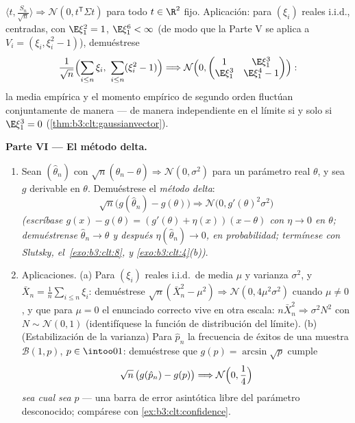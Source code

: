\begin{problem}
\begin{enumerate}[resume]
        $\langle t, \frac{S_n}{\sqrt n}\rangle
        \Rightarrow \mathcal N(0, t^{\mathsf T}\Sigma t)$ para todo
        $t \in \R^2$ fijo. Aplicación: para $(\xi_i)$ reales i.i.d.,
        centradas, con $\E\xi_1^2 = 1$, $\E\xi_1^6 < \infty$ (de modo
        que la Parte V se aplica a $V_i = (\xi_i, \xi_i^2 - 1)$),
        demuéstrese
        \[
        \frac1{\sqrt n}\Bigl(\sum_{i\leq n}\xi_i,\
        \sum_{i\leq n}(\xi_i^2 - 1)\Bigr) \Longrightarrow
        \mathcal N\Bigl(0, \begin{pmatrix} 1 & \E\xi_1^3\\
        \E\xi_1^3 & \E\xi_1^4 - 1\end{pmatrix}\Bigr) :
        \]
        la media empírica y el momento empírico de segundo orden
        fluctúan conjuntamente de manera  --- de manera
        independiente en el límite si y solo si $\E\xi_1^3 = 0$
        (\cref{thm:b3:clt:gaussianvector}).
\end{enumerate}

\medskip
\noindent\textbf{Parte VI --- El método delta.}
\begin{enumerate}[resume]
  \item Sean $(\hat\theta_n)$
   con
  $\sqrt n(\hat\theta_n - \theta) \Rightarrow
        \mathcal N(0, \sigma^2)$ para un parámetro real $\theta$, y sea
  $g$ derivable en $\theta$. Demuéstrese el \emph{método delta}:
        \[
        \sqrt n\bigl(g(\hat\theta_n) - g(\theta)\bigr)
        \Longrightarrow \mathcal N\bigl(0,
        g'(\theta)^2\sigma^2\bigr)
        \]
        \emph{(escríbase $g(x) - g(\theta) = (g'(\theta) +
        \eta(x))(x - \theta)$ con $\eta \to 0$ en $\theta$; demuéstrense
        $\hat\theta_n \to \theta$ y después $\eta(\hat\theta_n) \to 0$,
        en probabilidad; termínese con Slutsky, el~\cref{exo:b3:clt:8},
        y
        \cref{exo:b3:clt:4}(b))}.
  \item Aplicaciones. (a) Para $(\xi_i)$ reales i.i.d.\ de media $\mu$ y
  varianza $\sigma^2$, y $\bar X_n =
        \frac1n\sum_{i\leq n}\xi_i$: demuéstrese $\sqrt n(\bar
        X_n^2 - \mu^2) \Rightarrow \mathcal N(0,
        4\mu^2\sigma^2)$ cuando $\mu \neq 0$, y que para $\mu = 0$ el
  enunciado correcto vive en otra escala:
  $n\bar X_n^2 \Rightarrow \sigma^2N^2$ con $N \sim \mathcal N(0,1)$
  (identifíquese la función de distribución del límite). (b)
  (Estabilización de la varianza) Para $\hat p_n$ la frecuencia de
  éxitos de una muestra $\mathcal B(1, p)$, $p \in \intoo01$:
  demuéstrese que $g(p) = \arcsin\sqrt p$ cumple
        \[
        \sqrt n\,\bigl(g(\hat p_n) - g(p)\bigr)
        \Longrightarrow \mathcal N\Bigl(0, \frac14\Bigr)
        \]
        \emph{sea cual sea} $p$ --- una barra de error asintótica libre
        del parámetro desconocido; compárese con
        \cref{ex:b3:clt:confidence}.
\end{enumerate}


\end{problem}
